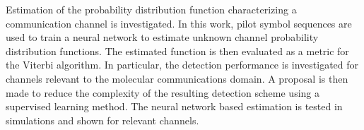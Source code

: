Estimation of the probability distribution function characterizing a communication channel is investigated. In this work, pilot symbol sequences are used to train a neural network to estimate unknown channel probability distribution functions. The estimated function is then evaluated as a metric for the Viterbi algorithm. In particular, the detection performance is investigated for channels relevant to the molecular communications domain. A proposal is then made to reduce the complexity of the resulting detection scheme using a supervised learning method. The neural network based estimation is tested in simulations and shown for relevant channels. 